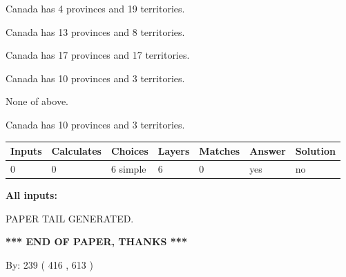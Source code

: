 \documentclass[12pt]{article}
\begin{document}
 
Canada has   4 provinces and  19 territories.
 
 
Canada has  13 provinces and  8 territories.
 
 
Canada has  17 provinces and  17 territories.
 
 
Canada has 10  provinces and 3 territories.
 
 
 None of above.
 
 
\noindent{}
 
 
Canada has 10  provinces and 3 territories.
 
 
\noindent{}
 
 
   
   
   
   
\noindent\begin{tabular}{|l|l|l|l|l|l|l|}
 \hline
Inputs & Calculates & Choices & Layers & Matches & Answer & Solution \\ \hline
 0  & 
 0  & 
 6
  simple  
  & 
 6  & 
 0  & 
  yes & 
  no 
  \\ \hline
 \end{tabular}
   
   
   
   
\noindent{}
   
   
   
   
\noindent\vspace{0.1in}\hspace{-0.08in} {\textbf{\Large{All inputs: }}}
   
   
   
   
   
   
 \vspace{0.2in}
 
   
   
\vspace{2.0in} PAPER TAIL GENERATED.
   
   
   
   
\vspace{1.0in} 
{\textbf{\large{ *** END OF PAPER, THANKS *** }}} 
   
   
\hspace{1.0in} By: 
 239 ( 416 ,  613 )
   
\end{document}
